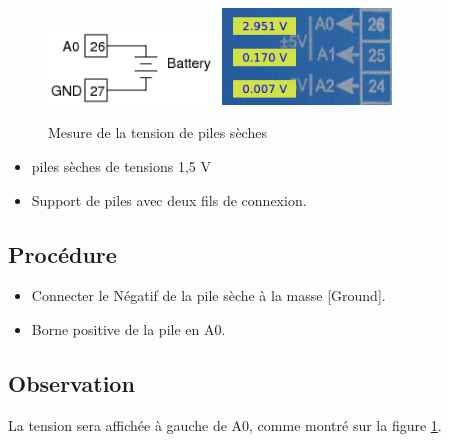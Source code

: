 \documentclass{book}
\begin{document}
\begin{figure}[h!]
\begin{center}
\caption{\label{measuring-drycells}Mesure de la tension de piles sèches }\vspace{0.5em}
\includegraphics[width=0.4\textwidth, height=0.3\textwidth, keepaspectratio]{Schematic-cell-voltage.png}
\includegraphics[width=0.4\textwidth, height=0.3\textwidth, keepaspectratio]{Pic-drycell-voltage.png}
\end{center}
\end{figure}



\begin{itemize}
  \item piles sèches de tensions 1,5 V
  \item Support de piles avec deux fils de connexion.
\end{itemize}

\subsection{Procédure}


\begin{itemize}
  \item Connecter le Négatif de la pile sèche à la masse [Ground].
  \item Borne positive de la pile en A0.
\end{itemize}

\subsection{Observation}


La tension sera affichée à gauche de A0, comme montré sur la figure \ref{measuring-drycells}.
\end{document}
